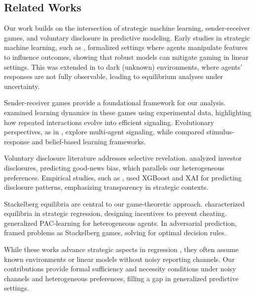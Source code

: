 \subsection{Related Works}

Our work builds on the intersection of strategic machine learning, sender-receiver games, and voluntary disclosure in predictive modeling. Early studies in strategic machine learning, such as \cite{hardt2016strategic}, formalized settings where agents manipulate features to influence outcomes, showing that robust models can mitigate gaming in linear settings. This was extended in \cite{ghalme2021strategic} to dark (unknown) environments, where agents' responses are not fully observable, leading to equilibrium analyses under uncertainty.

Sender-receiver games provide a foundational framework for our analysis. \cite{blume2002learning} examined learning dynamics in these games using experimental data, highlighting how repeated interactions evolve into efficient signaling. Evolutionary perspectives, as in \cite{skyrms2009evolution}, explore multi-agent signaling, while \cite{blume1998learning} compared stimulus-response and belief-based learning frameworks.

Voluntary disclosure literature addresses selective revelation. \cite{mcdonough2023voluntary} analyzed investor disclosures, predicting good-news bias, which parallels our heterogeneous preferences. Empirical studies, such as \cite{lu2024determinants}, used XGBoost and XAI for predicting disclosure patterns, emphasizing transparency in strategic contexts.

Stackelberg equilibria are central to our game-theoretic approach. \cite{jin2022incentive} characterized equilibria in strategic regression, designing incentives to prevent cheating. \cite{sundaram2023pac} generalized PAC-learning for heterogeneous agents. In adversarial prediction, \cite{bruckner2011stackelberg} framed problems as Stackelberg games, solving for optimal decision rules.

While these works advance strategic aspects in regression \cite{shavit2020causal}, they often assume known environments or linear models without noisy reporting channels. Our contributions provide formal sufficiency and necessity conditions under noisy channels and heterogeneous preferences, filling a gap in generalized predictive settings.
